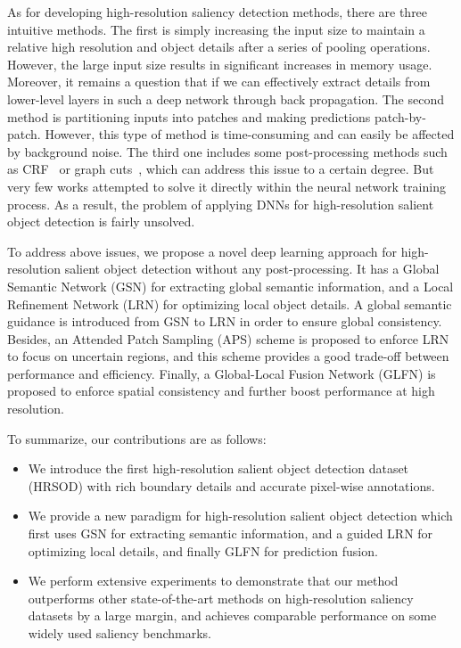As for developing high-resolution saliency detection methods, there are three intuitive methods. The first is simply increasing the input size to maintain a relative high resolution and object details after a series of pooling operations. However, the large input size results in significant increases in memory usage. Moreover, it remains a question that if we can effectively extract details from lower-level layers in such a deep network through back propagation. The second method is partitioning inputs into patches and making predictions patch-by-patch. However, this type of method is time-consuming and can easily be affected by background noise. The third one includes some post-processing methods such as CRF~\cite{krahenbuhl2011efficient} or graph cuts~\cite{rother2004grabcut}, which can address this issue to a certain degree. But very few works attempted to solve it directly within the neural network training process. As a result, the problem of applying DNNs for high-resolution salient object detection is fairly unsolved.

To address above issues, we propose a novel deep learning approach for high-resolution salient object detection without any post-processing. It has a Global Semantic Network (GSN) for extracting global semantic information, and a Local Refinement Network (LRN) for optimizing local object details. A global semantic guidance is introduced from GSN to LRN in order to ensure global consistency. Besides, an Attended Patch Sampling (APS) scheme is proposed to enforce LRN to focus on uncertain regions, and this scheme provides a good trade-off between performance and efficiency. Finally, a Global-Local Fusion Network (GLFN) is proposed to enforce spatial consistency and further boost performance at high resolution.

To summarize, our contributions are as follows:

\begin{itemize}
\item We introduce the first high-resolution salient object detection dataset (HRSOD) with rich boundary details and accurate pixel-wise annotations.
\item
We provide a new paradigm for high-resolution salient object detection which first uses GSN for extracting semantic information, and a guided LRN for optimizing local details, and finally GLFN for prediction fusion.
\item
We perform extensive experiments to demonstrate that our method outperforms other state-of-the-art methods on high-resolution saliency datasets by a large margin, and achieves comparable performance on some widely used saliency benchmarks.
\end{itemize}

